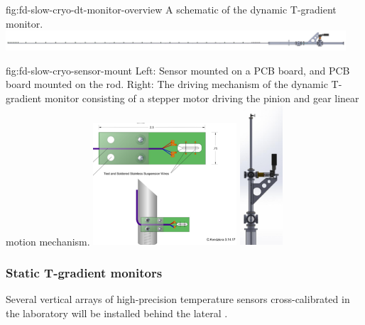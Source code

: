 \begin{dunefigure}{fig:fd-slow-cryo-dt-monitor-overview}
  {%
  A schematic of the dynamic T-gradient monitor.}
 \includegraphics[width=0.95\textwidth,angle=0]{graphics/cisc_DynamicProfiler.png}
\end{dunefigure}
\begin{dunefigure}{fig:fd-slow-cryo-sensor-mount}
  {Left: Sensor mounted on a PCB board, and PCB board mounted on the rod. Right:
    The driving mechanism of the dynamic T-gradient monitor consisting of a stepper motor driving the pinion and gear linear motion mechanism. }
  \includegraphics[width=0.40\textwidth]{graphics/cisc_DTSensorMount.png}
  \hspace{3cm}%
  \includegraphics[width=0.12\textwidth]{graphics/cisc_DTMotor.png}
\end{dunefigure}


\subsubsection{Static T-gradient monitors}
\label{sec:fdgen-slow-cryo-static-therm}

Several vertical arrays of high-precision temperature sensors cross-calibrated in the laboratory will be installed behind the lateral .  

